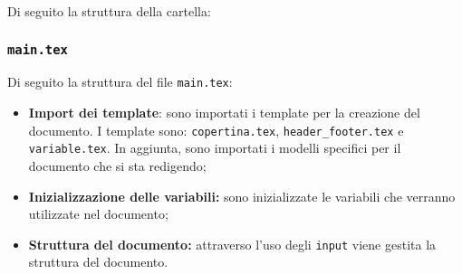 Di seguito la struttura della cartella:

\vspace{0.5cm}


\subsubsection{\texttt{main.tex}}
Di seguito la struttura del file \texttt{main.tex}:
\begin{itemize}
	\item \textbf{Import dei template}: sono importati i template per la
	      creazione del documento. I template sono: \texttt{copertina.tex},
	      \texttt{header\_footer.tex} e \texttt{variable.tex}. In aggiunta, sono
	      importati i modelli specifici per il documento che si sta redigendo;

	\item \textbf{Inizializzazione delle variabili:} sono inizializzate le
	      variabili che verranno utilizzate nel documento;

	\item \textbf{Struttura del documento:} attraverso l'uso degli
	      \texttt{input} viene gestita la struttura del documento.
\end{itemize}

